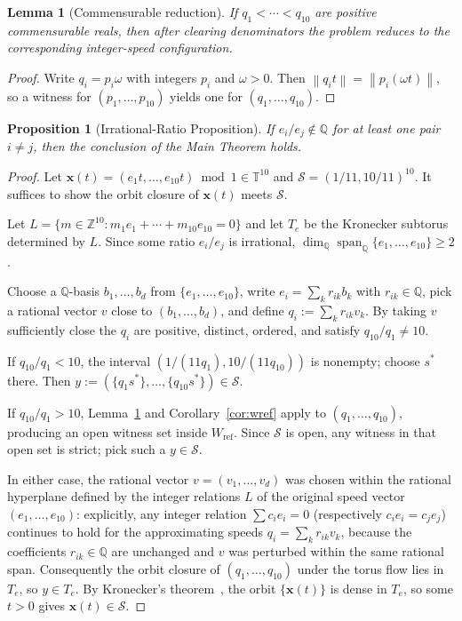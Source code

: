 \documentclass[12pt,a4paper]{amsart}
\newtheorem{lemma}[theorem]{Lemma}
\newtheorem{proposition}[theorem]{Proposition}
\theoremstyle{definition}
\theoremstyle{remark}
\newcommand{\Wref}{W_{\mathrm{ref}}}
\newcommand{\norm}[1]{\left\|#1\right\|}
\begin{document}
\begin{lemma}[Commensurable reduction]\label{lem:comred}
If $q_1<\cdots<q_{10}$ are positive commensurable reals, then after clearing denominators
the problem reduces to the corresponding integer-speed configuration.
\end{lemma}

\begin{proof}
Write $q_i=p_i\omega$ with integers $p_i$ and $\omega>0$. Then
$\norm{q_it}=\norm{p_i(\omega t)}$,
so a witness for $(p_1,\ldots,p_{10})$ yields one for $(q_1,\ldots,q_{10})$.
\end{proof}

\begin{proposition}[Irrational-Ratio Proposition]\label{prop:irrat}
If $e_i/e_j\notin\mathbb{Q}$ for at least one pair $i\ne j$, then the conclusion of the
Main Theorem holds.
\end{proposition}

\begin{proof}
Let $\mathbf{x}(t)=(e_1t,\ldots,e_{10}t)\bmod 1\in\mathbb{T}^{10}$ and
$\mathcal{S}=(1/11,10/11)^{10}$. It suffices to show the orbit closure of $\mathbf{x}(t)$
meets $\mathcal{S}$.

Let $L=\{m\in\mathbb{Z}^{10}:m_1e_1+\cdots+m_{10}e_{10}=0\}$ and let $T_e$ be the
Kronecker subtorus determined by $L$. Since some ratio $e_i/e_j$ is irrational,
$\dim_{\mathbb{Q}}\operatorname{span}_{\mathbb{Q}}\{e_1,\ldots,e_{10}\}\ge 2$.

Choose a $\mathbb{Q}$-basis $b_1,\ldots,b_d$ from $\{e_1,\ldots,e_{10}\}$, write
$e_i=\sum_{k}r_{ik}b_k$ with $r_{ik}\in\mathbb{Q}$, pick a rational vector $v$ close to
$(b_1,\ldots,b_d)$, and define $q_i:=\sum_k r_{ik}v_k$. By taking $v$ sufficiently close
the $q_i$ are positive, distinct, ordered, and satisfy $q_{10}/q_1\ne 10$.

If $q_{10}/q_1<10$, the interval $(1/(11q_1),10/(11q_{10}))$ is nonempty; choose $s^*$
there. Then $y:=(\{q_1s^*\},\ldots,\{q_{10}s^*\})\in\mathcal{S}$.

If $q_{10}/q_1>10$, Lemma~\ref{lem:comred} and Corollary~\ref{cor:wref} apply to
$(q_1,\ldots,q_{10})$, producing an open witness set inside $\Wref$. Since $\mathcal{S}$
is open, any witness in that open set is strict; pick such a $y\in\mathcal{S}$.

In either case, the rational vector $v=(v_1,\ldots,v_d)$ was chosen within the rational
hyperplane defined by the integer relations $L$ of the original speed vector $(e_1,\ldots,e_{10})$:
explicitly, any integer relation $\sum c_i e_i=0$ (respectively $c_ie_i=c_je_j$) continues
to hold for the approximating speeds $q_i=\sum_k r_{ik}v_k$, because the coefficients
$r_{ik}\in\mathbb{Q}$ are unchanged and $v$ was perturbed within the same rational span.
Consequently the orbit closure of $(q_1,\ldots,q_{10})$ under the torus flow lies in $T_e$,
so $y\in T_e$.
By Kronecker's theorem~\cite{KN74}, the orbit $\{\mathbf{x}(t)\}$ is dense in $T_e$,
so some $t>0$ gives $\mathbf{x}(t)\in\mathcal{S}$.
\end{proof}
\end{document}
